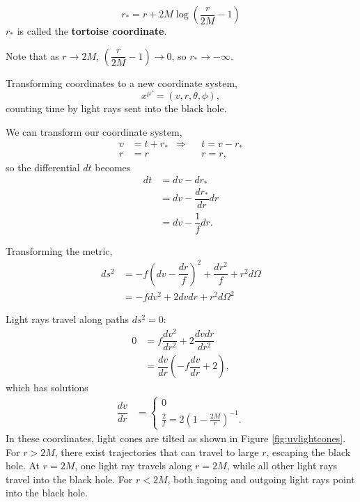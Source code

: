 \documentclass[10pt]{article}
\begin{document}
\begin{itemize}
\begin{equation}
r_* = r + 2M \log\left(\dfrac{r}{2M}-1\right)
\end{equation}
$r_*$ is called the \textbf{tortoise coordinate}.

Note that as $r \rightarrow 2M$, $\left(\dfrac{r}{2M}-1\right)\rightarrow 0$, so $r_*\rightarrow -\infty$.

Transforming coordinates to a new coordinate system,
\begin{equation}
x^{\mu '} = (v,r,\theta,\phi),
\end{equation}
counting time by light rays sent into the black hole.

We can transform our coordinate system,
\begin{align}
v&=t+r_* & \Rightarrow & &t=v-r_*
\\r&=r &  &  &r=r,
\end{align}
so the differential $dt$ becomes
\begin{align}
dt&=dv-dr_*
\\ &=dv - \dfrac{dr_*}{dr}dr
\\ &=dv-\dfrac{1}{f}dr.
\end{align}

Transforming the metric,
\begin{align}
ds^2 &= -f\left(dv-\dfrac{dr}{f}\right)^2+\dfrac{dr^2}{f}+r^2 d\Omega
\\ &=-f dv^2 + 2dv dr + r^2 d\Omega^2
\end{align}

Light rays travel along paths $ds^2=0$:
\begin{align}
0 &=f\dfrac{dv^2}{dr^2}+2\dfrac{dv dr}{dr^2}
\\ &=\dfrac{dv}{dr}\left(-f\dfrac{dv}{dr}+2\right),
\end{align}
which has solutions
\begin{align}
\dfrac{dv}{dr} &=
\begin{cases}
0
\\ \frac{2}{f}=2\left(1-\frac{2M}{r}\right)^{-1}.
\end{cases}
\end{align}
In these coordinates, light cones are tilted as shown in Figure \ref{fig:uvlightcones}.
For $r>2M$, there exist trajectories that can travel to large $r$, escaping the black hole. At $r=2M$, one light ray travels along $r=2M$, while all other light rays travel into the black hole. For $r<2M$, both ingoing and outgoing light rays point into the black hole.


\end{itemize}
\end{document}
